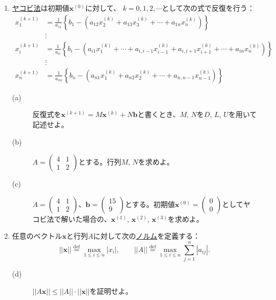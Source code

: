 \setlength{\leftmargini}{0pt}
\begin{enumerate}
\addtolength{\itemsep}{1zw}
\item \underline{ヤコビ法}は初期値$\mathbf{x}^{(0)}$に対して、
  $k=0, 1, 2, \cdots$として次の式で反復を行う：
\begin{equation*}
  \begin{split}
    x^{(k+1)}_{1} &= \frac{1}{a_{11}}\left\{b_{1} - \left(a_{12}x^{(k)}_{2} + a_{13}x^{(k)}_{3} + \cdots + a_{1n}x^{(k)}_{n}\right) \right\}\\
                  &\vdots\\
    x^{(k+1)}_{i} &= \frac{1}{a_{ii}}\left\{b_{i} - \left(a_{i1}x^{(k)}_{1} + \cdots + a_{i,i-1}x^{(k)}_{i-1} + a_{i,i+1}x^{(k)}_{i+1} + \cdots + a_{in}x^{(k)}_{n}\right) \right\}\\
                  &\vdots\\
    x^{(k+1)}_{n} &= \frac{1}{a_{nn}}\left\{b_{n} - \left(a_{n1}x^{(k)}_{1} + a_{n2}x^{(k)}_{2} + \cdots + a_{n,n-1}x^{(k)}_{n-1}\right) \right\}
    \end{split}
\end{equation*}
\begin{description}
\item[(a)] 反復式を$\mathbf{x}^{(k+1)} = M\mathbf{x}^{(k)} + N\mathbf{b}$と書くとき、$M$, $N$を$D$, $L$, $U$を用いて記述せよ。
\item[(b)] $\displaystyle A = \begin{pmatrix} 4 & 1 \\ 1 & 2 \end{pmatrix}$とする。行列$M$, $N$を求めよ。
\item[(c)] $\displaystyle A = \begin{pmatrix} 4 & 1 \\ 1 & 2 \end{pmatrix}$、$\displaystyle \mathbf{b} = \begin{pmatrix} 15 \\ 9\end{pmatrix}$とする。初期値$\displaystyle \mathbf{x}^{(0)} = \begin{pmatrix} 0 \\ 0\end{pmatrix}$としてヤコビ法で解いた場合の、$\mathbf{x}^{(1)}$, $\mathbf{x}^{(2)}$, $\mathbf{x}^{(3)}$を求めよ。
\end{description}

\newpage

\item 任意のベクトル$\mathbf{x}$と行列$A$に対して次の\underline{ノルム}を定義する：
  \begin{equation*}
      ||\mathbf{x}|| \stackrel{\text{def}}{=} \max_{1\le i\le n}|x_{i}|,\qquad
      ||A|| \stackrel{\text{def}}{=} \max_{1\le i\le n} \sum_{j=1}^{n}\left|a_{ij}\right|.
  \end{equation*}
  \begin{description}
  \item[(d)] $\displaystyle ||A\mathbf{x}||\le ||A||\cdot||\mathbf{x}||$を証明せよ。
  \end{description}
  

\end{enumerate}

